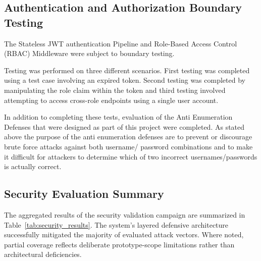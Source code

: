 \subsection{Authentication and Authorization Boundary Testing}
The Stateless JWT authentication Pipeline and Role-Based Access Control (RBAC) Middleware were subject to boundary testing.

Testing was performed on three different scenarios. First testing was completed using a test case involving an expired token. Second testing was completed by manipulating the role claim within the token and third testing involved attempting to access cross-role endpoints using a single user account.

In addition to completing these tests, evaluation of the Anti Enumeration Defenses that were designed as part of this project were completed. As stated above the purpose of the anti enumeration defenses are to prevent or discourage brute force attacks against both username/ password combinations and to make it difficult for attackers to determine which of two incorrect usernames/passwords is actually correct.
\subsection{Security Evaluation Summary}
The aggregated results of the security validation campaign are summarized in Table~\ref{tab:security_results}. The system's layered defensive architecture successfully mitigated the majority of evaluated attack vectors. Where noted, partial coverage reflects deliberate prototype-scope limitations rather than architectural deficiencies.

